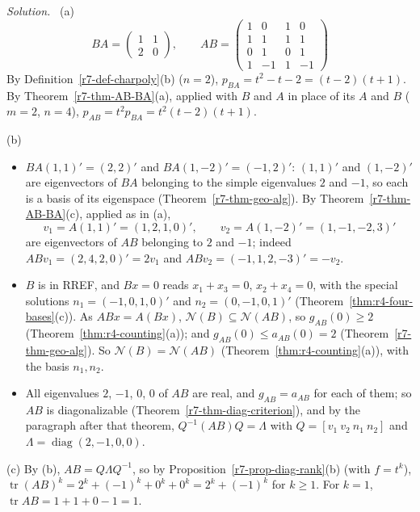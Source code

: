 \documentclass[12pt]{article}
\DeclareMathOperator{\tr}{tr}
\DeclareMathOperator{\diag}{diag}
\theoremstyle{definition}
\newenvironment{solution}{\par\noindent\textit{Solution.}\ }{\par\smallskip}
\begin{document}
\begin{solution}
(a)
\[
BA=\begin{pmatrix}1&1\\2&0\end{pmatrix},\qquad
AB=\begin{pmatrix}1&0&1&0\\1&1&1&1\\0&1&0&1\\1&-1&1&-1\end{pmatrix}
\]
By Definition~\ref{r7-def-charpoly}(b) (\(n=2\)), \(p_{BA}=t^2-t-2=(t-2)(t+1)\). By Theorem~\ref{r7-thm-AB-BA}(a),
applied with \(B\) and \(A\) in place of its \(A\) and \(B\) (\(m=2\), \(n=4\)), \(p_{AB}=t^2p_{BA}=t^2(t-2)(t+1)\).

(b)
\begin{itemize}
\item \(BA(1,1)'=(2,2)'\) and \(BA(1,-2)'=(-1,2)'\): \((1,1)'\) and \((1,-2)'\) are eigenvectors of \(BA\) belonging to
the simple eigenvalues \(2\) and \(-1\), so each is a basis of its eigenspace (Theorem~\ref{r7-thm-geo-alg}). By
Theorem~\ref{r7-thm-AB-BA}(c), applied as in (a),
\[
v_1=A(1,1)'=(1,2,1,0)',\qquad v_2=A(1,-2)'=(1,-1,-2,3)'
\]
are eigenvectors of \(AB\) belonging to \(2\) and \(-1\); indeed \(ABv_1=(2,4,2,0)'=2v_1\) and
\(ABv_2=(-1,1,2,-3)'=-v_2\).
\item \(B\) is in RREF, and \(Bx=0\) reads \(x_1+x_3=0\), \(x_2+x_4=0\), with the special solutions
\(n_1=(-1,0,1,0)'\) and \(n_2=(0,-1,0,1)'\) (Theorem~\ref{thm:r4-four-bases}(c)). As \(ABx=A(Bx)\),
\(\mathcal N(B)\subseteq\mathcal N(AB)\), so \(g_{AB}(0)\geqslant2\) (Theorem~\ref{thm:r4-counting}(a)); and
\(g_{AB}(0)\leqslant a_{AB}(0)=2\) (Theorem~\ref{r7-thm-geo-alg}). So \(\mathcal N(B)=\mathcal N(AB)\)
(Theorem~\ref{thm:r4-counting}(a)), with the basis \(n_1,n_2\).
\item All eigenvalues \(2\), \(-1\), \(0\), \(0\) of \(AB\) are real, and \(g_{AB}=a_{AB}\) for each of them; so \(AB\) is
diagonalizable (Theorem~\ref{r7-thm-diag-criterion}), and by the paragraph after that theorem, \(Q^{-1}(AB)Q=\Lambda\)
with \(Q=[v_1\ v_2\ n_1\ n_2]\) and \(\Lambda=\diag(2,-1,0,0)\).
\end{itemize}
(c) By (b), \(AB=Q\Lambda Q^{-1}\), so by Proposition~\ref{r7-prop-diag-rank}(b) (with \(f=t^k\)),
\(\tr(AB)^k=2^k+(-1)^k+0^k+0^k=2^k+(-1)^k\) for \(k\geqslant1\). For \(k=1\), \(\tr AB=1+1+0-1=1\).
\end{solution}
\end{document}
